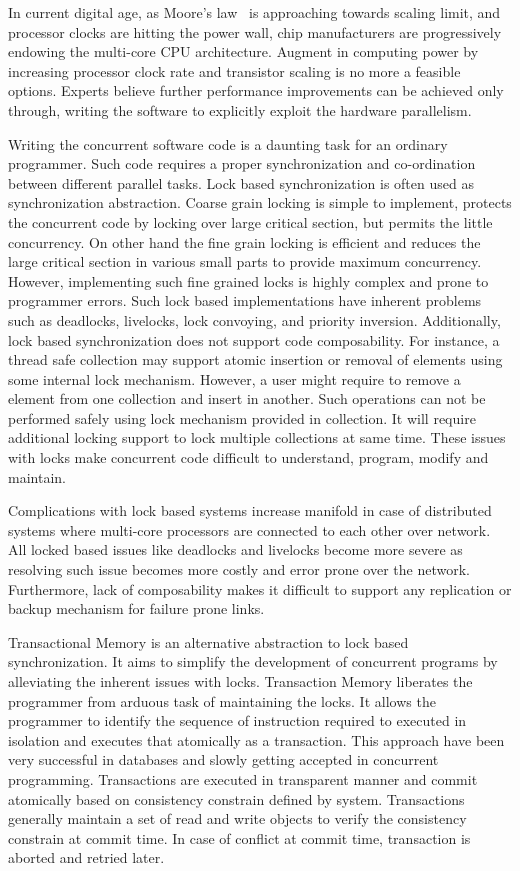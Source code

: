\documentclass[12pt,english]{report}
\begin{document}
In current digital age, as Moore's law~\cite{schaller1997moore} is approaching towards scaling limit, and processor clocks are hitting the power wall, chip manufacturers are progressively endowing the multi-core CPU architecture. Augment in computing power by increasing processor clock rate and transistor scaling is no more a feasible options. Experts believe further performance improvements can be achieved only through, writing the software to explicitly exploit the hardware parallelism. 

Writing the concurrent software code is a daunting task for an ordinary programmer. Such code requires a proper synchronization and co-ordination between different parallel tasks. Lock based synchronization is often used as synchronization abstraction. Coarse grain locking is simple to implement, protects the concurrent code by locking over large critical section, but permits the little concurrency. On other hand the fine grain locking is efficient and reduces the large critical section in various small parts to provide maximum concurrency. However, implementing such fine grained locks is highly complex and prone to programmer errors. Such lock based implementations have inherent problems such as deadlocks, livelocks, lock convoying, and priority inversion. Additionally, lock based synchronization does not support code composability. For instance, a thread safe collection may support atomic insertion or removal of elements using some internal lock mechanism. However, a user might require to remove a element from one collection and insert in another. Such operations can not be performed safely using lock mechanism provided in collection. It will require additional locking support to lock multiple collections at same time. These issues with locks make concurrent code difficult to understand, program, modify and maintain.

Complications with lock based systems increase manifold in case of distributed systems where multi-core processors are connected to each other over network. All locked based issues like deadlocks and livelocks become more severe as resolving such issue becomes more costly and error prone over the network. Furthermore, lack of composability makes it difficult to support any replication or backup mechanism for failure  prone links.    

Transactional Memory is an alternative abstraction to lock based synchronization. It aims to simplify the development of concurrent programs by alleviating the inherent issues with locks. Transaction Memory liberates the programmer from arduous task of maintaining the locks. It allows the programmer to identify the  sequence of instruction required to executed in isolation and executes that atomically as a transaction. This approach have been very successful in databases and slowly getting accepted in concurrent programming. Transactions are executed in transparent manner and commit atomically based on consistency constrain defined by system. Transactions generally maintain a set of read and write objects to verify the consistency constrain at commit time. In case of conflict at commit time, transaction is aborted and retried later.      
\end{document}
